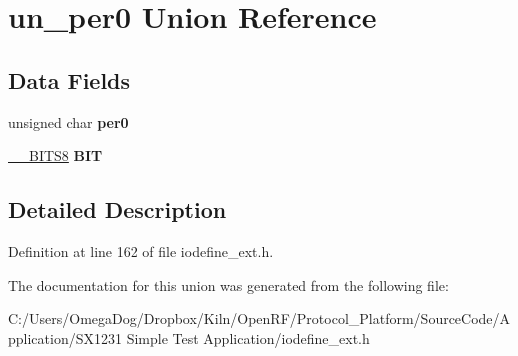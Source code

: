 \hypertarget{unionun__per0}{\section{un\-\_\-per0 Union Reference}
\label{unionun__per0}
}
\subsection*{Data Fields}
\begin{DoxyCompactItemize}
\item 
\hypertarget{unionun__per0_ae0ce8679f3178d875a0ab8b9d51e8cf8}{unsigned char {\bfseries per0}}\label{unionun__per0_ae0ce8679f3178d875a0ab8b9d51e8cf8}

\item 
\hypertarget{unionun__per0_ab8e266efb198f3480bcaadc934535220}{\hyperlink{struct_____b_i_t_s8}{\-\_\-\-\_\-\-B\-I\-T\-S8} {\bfseries B\-I\-T}}\label{unionun__per0_ab8e266efb198f3480bcaadc934535220}

\end{DoxyCompactItemize}


\subsection{Detailed Description}


Definition at line 162 of file iodefine\-\_\-ext.\-h.



The documentation for this union was generated from the following file\-:\begin{DoxyCompactItemize}
\item 
C\-:/\-Users/\-Omega\-Dog/\-Dropbox/\-Kiln/\-Open\-R\-F/\-Protocol\-\_\-\-Platform/\-Source\-Code/\-Application/\-S\-X1231 Simple Test Application/iodefine\-\_\-ext.\-h\end{DoxyCompactItemize}
